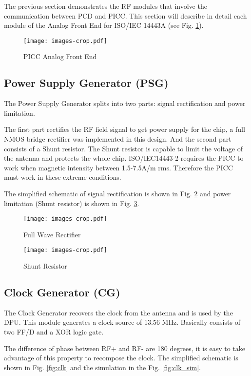 The previous section demonstrates the RF modules that involve  the communication between PCD and PICC. This section will describe in detail each module of the Analog Front End for ISO/IEC 14443A (see Fig. \ref{fig:afe}).

\begin{figure}[]
  \centering
  \texttt{[image: images-crop.pdf]}
  \caption{PICC Analog Front End}
  \label{fig:afe}
\end{figure}

\subsection{Power Supply Generator (PSG)}

The Power Supply Generator splits into two parts: signal rectification and power limitation.

The first part rectifies the RF field signal to get power supply for the chip, a full NMOS bridge rectifier was implemented in this design. And the second part consists of a Shunt resistor. The Shunt resistor is capable to limit the voltage of the antenna and protects the whole chip. ISO/IEC14443-2 requires the PICC to work when magnetic intensity between 1.5-7.5A/m rms. Therefore the PICC must work in these extreme conditions.  

The simplified schematic of signal rectification is shown in Fig. \ref{fig:rect} and power limitation (Shunt resistor) is shown in Fig. \ref{fig:shunt}.

\begin{figure}[h]
  \centering
  \texttt{[image: images-crop.pdf]}
  \caption{Full Wave Rectifier}
  \label{fig:rect}
\end{figure}

\begin{figure}[h]
  \centering
  \texttt{[image: images-crop.pdf]}
  \caption{Shunt Resistor}
  \label{fig:shunt}
\end{figure}

\subsection{Clock Generator (CG)}

The Clock Generator recovers the clock from the antenna and is used by the DPU. This module generates a clock source of 13.56 MHz. Basically consists of two FF/D and a XOR logic gate. 

The difference of phase between RF+ and RF- are 180 degrees, it is easy to take advantage of this property to recompose the clock. The simplified schematic is shown in Fig. \ref{fig:clk} and the simulation in the Fig. \ref{fig:clk_sim}.


